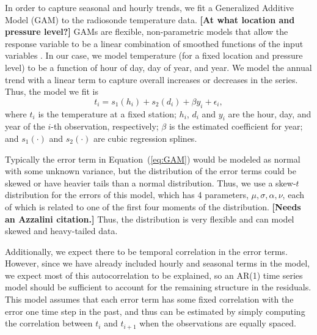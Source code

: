 \documentclass[12pt]{article}
\def\ni{\noindent}
\begin{document}
\begin{doublespacing}
In order to capture seasonal and hourly trends, we fit a Generalized Additive Model (GAM) to the radiosonde temperature data.  \textbf{[At what location and pressure level?]} GAMs are flexible, non-parametric models that allow the response variable to be a linear combination of smoothed functions of the input variables \cite{bell14}.  In our case, we model temperature (for a fixed location and pressure level) to be a function of hour of day, day of year, and year.  We model the annual trend with a linear term to capture overall increases or decreases in the series.  Thus, the model we fit is
\begin{equation} \label{eq:GAM}
	t_i = s_1(h_i) + s_2(d_i) + \beta y_i + \epsilon_i,
\end{equation}
\ni where $t_i$ is the temperature at a fixed station; $h_i$, $d_i$ and $y_i$ are the hour, day, and year of the $i$-th observation, respectively; $\beta$ is the estimated coefficient for year; and $s_1(\cdot)$ and $s_2(\cdot)$ are cubic regression splines.

Typically the error term in Equation~(\ref{eq:GAM}) would be modeled as normal with some unknown variance, but the distribution of the error terms could be skewed or have heavier tails than a normal distribution.  Thus, we use a skew-$t$ distribution for the errors of this model, which has 4 parameters, $\mu, \sigma, \alpha, \nu$, each of which is related to one of the first four moments of the distribution. \textbf{[Needs an Azzalini citation.]}  Thus, the distribution is very flexible and can model skewed and heavy-tailed data.



Additionally, we expect there to be temporal correlation in the error terms.  However, since we have already included hourly and seasonal terms in the model, we expect most of this autocorrelation to be explained, so an AR(1) time series model should be sufficient to account for the remaining structure in the residuals.  This model assumes that each error term has some fixed correlation with the error one time step in the past, and thus can be estimated by simply computing the correlation between $t_i$ and $t_{i+1}$ when the observations are equally spaced.


\end{doublespacing}
\end{document}
